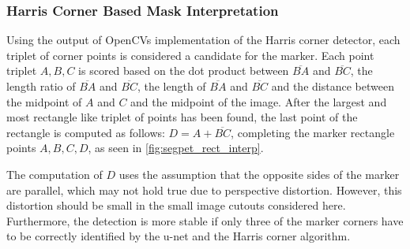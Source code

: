 \documentclass[10pt]{book}
\newcommand{\figureref}[1]{\autoref{#1}}
\begin{document}
\subsubsection{Harris Corner Based Mask Interpretation}

Using the output of \acp{OpenCV} implementation of the Harris corner detector, each triplet of corner points is considered a candidate for the marker. Each point triplet $A,B,C$ is scored based on the dot product between $\overline{BA}$ and $\overline{BC}$, the length ratio of $\overline{BA}$ and $\overline{BC}$, the length of $\overline{BA}$ and $\overline{BC}$ and the distance between the midpoint of $A$ and $C$ and the midpoint of the image. After the largest and most rectangle like triplet of points has been found, the last point of the rectangle is computed as follows: $D = A + \overline{BC}$, completing the marker rectangle points $A,B,C,D$, as seen in \figureref{fig:segpet_rect_interp}. 

The computation of $D$ uses the assumption that the opposite sides of the marker are parallel, which may not hold true due to perspective distortion. However, this distortion should be small in the small image cutouts considered here. Furthermore, the detection is more stable if only three of the marker corners have to be correctly identified by the u-net and the Harris corner algorithm. 
\end{document}
